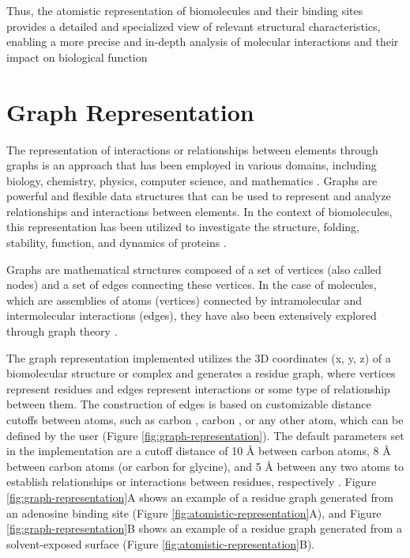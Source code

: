 \documentclass[Ingles]{phdthesis}
\begin{document}
Thus, the atomistic representation of biomolecules and their binding sites provides a detailed and specialized view of relevant structural characteristics, enabling a more precise and in-depth analysis of molecular interactions and their impact on biological function

\section{Graph Representation \label{sec:graph-representation}}


The representation of interactions or relationships between elements through graphs is an approach that has been employed in various domains, including biology, chemistry, physics, computer science, and mathematics \cite{foulds1995,majeed2020}. Graphs are powerful and flexible data structures that can be used to represent and analyze relationships and interactions between elements. In the context of biomolecules, this representation has been utilized to investigate the structure, folding, stability, function, and dynamics of proteins \cite{vishveshwara2002}.

Graphs are mathematical structures composed of a set of vertices (also called nodes) and a set of edges connecting these vertices. In the case of molecules, which are assemblies of atoms (vertices) connected by intramolecular and intermolecular interactions (edges), they have also been extensively explored through graph theory \cite{vishveshwara2002,mason2007}.

The graph representation implemented utilizes the 3D coordinates (x, y, z) of a biomolecular structure or complex and generates a residue graph, where vertices represent residues and edges represent interactions or some type of relationship between them. The construction of edges is based on customizable distance cutoffs between atoms, such as carbon \textalpha, carbon \textbeta, or any other atom, which can be defined by the user (Figure \ref{fig:graph-representation}). The default parameters set in the implementation are a cutoff distance of 10 Å between carbon \textalpha\space atoms, 8 Å between carbon \textbeta\space atoms (or carbon \textalpha\space for glycine), and 5 Å between any two atoms to establish relationships or interactions between residues, respectively \cite{vishveshwara2002,mason2007}. Figure \ref{fig:graph-representation}A shows an example of a residue graph generated from an adenosine binding site (Figure \ref{fig:atomistic-representation}A), and Figure \ref{fig:graph-representation}B shows an example of a residue graph generated from a solvent-exposed surface (Figure \ref{fig:atomistic-representation}B).
\end{document}
